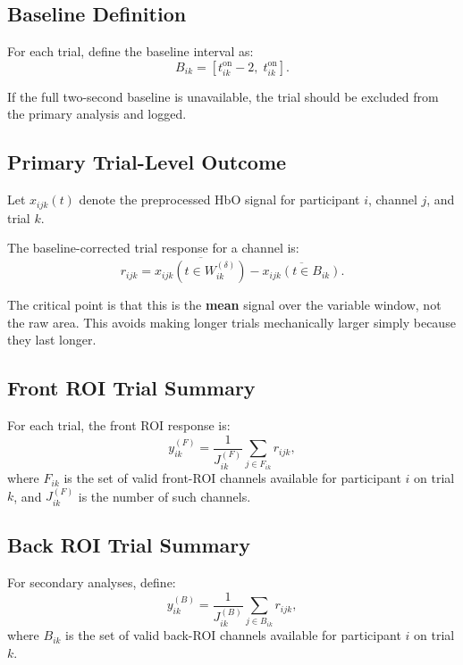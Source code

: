 \documentclass[11pt]{article}
\begin{document}
\subsection{Baseline Definition}
For each trial, define the baseline interval as:
\begin{equation}
B_{ik} = [t^{\mathrm{on}}_{ik} - 2,\; t^{\mathrm{on}}_{ik}].
\end{equation}

If the full two-second baseline is unavailable, the trial should be excluded from the primary analysis
and logged.

\subsection{Primary Trial-Level Outcome}
Let \(x_{ijk}(t)\) denote the preprocessed HbO signal for participant \(i\), channel \(j\), and trial \(k\).

The baseline-corrected trial response for a channel is:
\begin{equation}
r_{ijk}
=
\overline{x_{ijk}(t \in W^{(\delta)}_{ik})}
-
\overline{x_{ijk}(t \in B_{ik})}.
\end{equation}

The critical point is that this is the \textbf{mean} signal over the variable window, not the raw area.
This avoids making longer trials mechanically larger simply because they last longer.

\subsection{Front ROI Trial Summary}
For each trial, the front ROI response is:
\begin{equation}
y^{(F)}_{ik}
=
\frac{1}{J^{(F)}_{ik}}
\sum_{j \in F_{ik}} r_{ijk},
\end{equation}
where \(F_{ik}\) is the set of valid front-ROI channels available for participant \(i\) on trial \(k\),
and \(J^{(F)}_{ik}\) is the number of such channels.

\subsection{Back ROI Trial Summary}
For secondary analyses, define:
\begin{equation}
y^{(B)}_{ik}
=
\frac{1}{J^{(B)}_{ik}}
\sum_{j \in B_{ik}} r_{ijk},
\end{equation}
where \(B_{ik}\) is the set of valid back-ROI channels available for participant \(i\) on trial \(k\).
\end{document}
